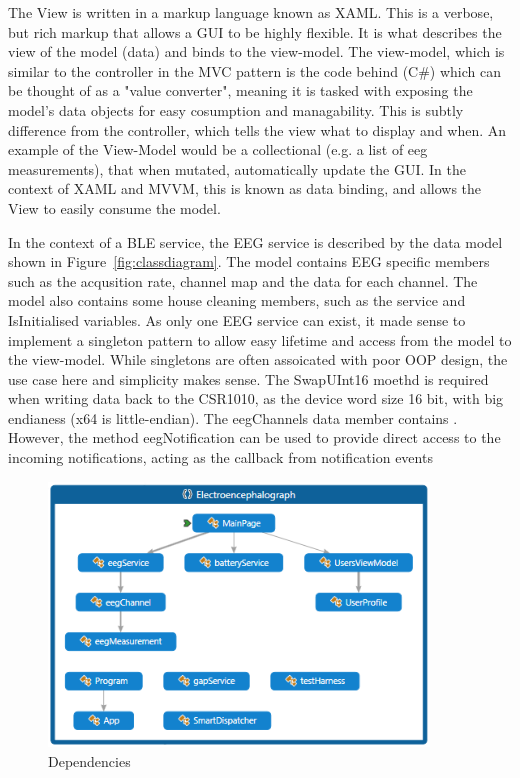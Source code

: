 \documentclass[]{article}
\begin{document}
The View is written in a markup language known as \ac{XAML}. This is a verbose, but rich markup that allows a \ac{GUI} to be highly flexible. It is what describes the view of the model (data) and binds to the view-model. The view-model, which is similar to the controller in the \ac{MVC} pattern is the code behind (C\#) which can be thought of as a "value converter", meaning it is tasked with exposing the model's data objects for easy cosumption and managability. This is subtly difference from the controller, which tells the view what to display and when. An example of the View-Model would be a collectional (e.g. a list of eeg measurements), that when mutated, automatically update the \ac{GUI}. In the context of \ac{XAML} and \ac{MVVM}, this is known as data binding, and allows the View to easily consume the model.

In the context of a \ac{BLE} service, the \ac{EEG} service is described by the data model shown in Figure~\ref{fig:classdiagram}. The model contains \ac{EEG} specific members such as the acqusition rate, channel map and the data for each channel. The model also contains some house cleaning members, such as the service and IsInitialised variables. As only one \ac{EEG} service can exist, it made sense to implement a singleton pattern to allow easy lifetime and access from the model to the view-model. While singletons are often assoicated with poor \ac{OOP} design, the use case here and simplicity makes sense. The SwapUInt16 moethd is required when writing data back to the CSR1010, as the device word size 16 bit, with big endianess (x64 is little-endian). The eegChannels data member contains . However, the method eegNotification can be used to provide direct access to the incoming notifications, acting as the callback from notification events

\begin{figure}[htb]
	\begin{center}
		\includegraphics[width = 0.9\textwidth]{dep}
	\end{center}
	\caption{Dependencies}
	\label{fig:dep}
\end{figure}
\end{document}
